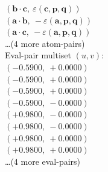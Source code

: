 \documentclass[a4paper,11pt]{article}
\newcommand{\pdcegfomjfhook}[2]{\mathbf{#1} \cdot \mathbf{#2}}
\newcommand{\kblbmcpggoncpf}[3]{\varepsilon(\mathbf{#1},\mathbf{#2},\mathbf{#3})}
\begin{document}
$(\pdcegfomjfhook{b}{c},\ \kblbmcpggoncpf{c}{p}{q})$\\
$(\pdcegfomjfhook{a}{b},\ -\kblbmcpggoncpf{a}{p}{q})$\\
$(\pdcegfomjfhook{a}{c},\ -\kblbmcpggoncpf{a}{p}{q})$\\
\quad \ldots (4 more atom-pairs)\\
\quad Eval-pair multiset $(u, v)$:\\
$(-0.5900,\ +0.0000)$\\
$(-0.5900,\ +0.0000)$\\
$(-0.5900,\ +0.0000)$\\
$(-0.5900,\ -0.0000)$\\
$(+0.9800,\ -0.0000)$\\
$(+0.9800,\ -0.0000)$\\
$(+0.9800,\ +0.0000)$\\
$(+0.9800,\ +0.0000)$\\
\quad \ldots (4 more eval-pairs)\\
\end{document}

